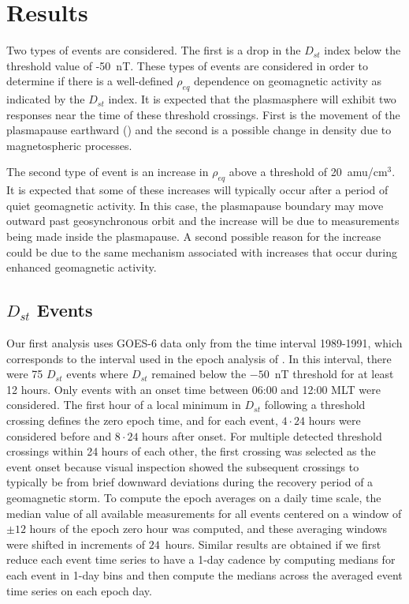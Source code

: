\documentclass[12pt]{article}
\providecommand{\DIFaddtex}[1]{{\protect\color{blue}\uwave{#1}}} %
\providecommand{\DIFaddbegin}{} %
\providecommand{\DIFaddend}{} %
\providecommand{\DIFadd}[1]{\texorpdfstring{\DIFaddtex{#1}}{#1}} %
\begin{document}
\section{Results}

Two types of events are considered. The first is a drop in the $D_{st}$ index below the threshold value of -50~nT. These types of events are considered in order to determine if there is a well-defined $\rho_{eq}$ dependence on geomagnetic activity as indicated by the $D_{st}$ index.  It is expected that the plasmasphere will exhibit two responses near the time of these threshold crossings.  First is the movement of the plasmapause earthward (\cite{LemaireEarthsPlasmasphere}) and the second is a possible change in density due to magnetospheric processes. 

The second type of event is an increase in $\rho_{eq}$ above a threshold of 20~amu/cm$^3$.  It is expected that some of these increases will typically occur after a period of quiet geomagnetic activity.  In this case, the plasmapause boundary may move outward past geosynchronous orbit and the increase will be due to measurements being made inside the plasmapause.  A second possible reason for the increase could be due to the same mechanism associated with increases that occur during enhanced geomagnetic activity.

\subsection{$D_{st}$ Events}

Our first analysis uses GOES-6 data only from the time interval 1989-1991, which corresponds to the interval used in the epoch analysis of \cite{Takahashi2010}. In this interval, there were 75 $D_{st}$ events where $D_{st}$ remained below the $-50$~nT threshold for at least 12 hours. Only events with an onset time \DIFaddbegin \DIFadd{when the spacecraft was located }\DIFaddend between 06:00 and 12:00 MLT were considered. The first hour of a local minimum in $D_{st}$ following a threshold crossing defines the zero epoch time, and for each event, $4\cdot24$ hours were considered before and $8\cdot24$ hours after onset. For multiple detected threshold crossings within 24 hours of each other, the first crossing was selected as the event onset because visual inspection showed the subsequent crossings to typically be from brief downward deviations during the recovery period of a geomagnetic storm. To compute the epoch averages on a daily time scale, the median value of all available measurements for all events centered on a window of $\pm 12$ hours of the epoch zero hour was computed, and these averaging windows were shifted in increments of $24$~hours. Similar results are obtained if we first reduce each event time series to have a 1-day cadence by computing medians for each event in 1-day bins and then compute the medians across the averaged event time series on each epoch day. 
\end{document}
